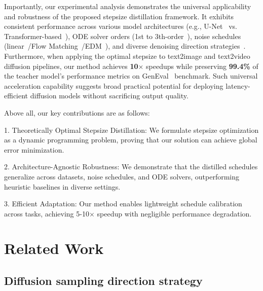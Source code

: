 \documentclass[10pt,twocolumn,letterpaper]{article}
\begin{document}
    Importantly, our experimental analysis demonstrates the universal applicability and robustness of the proposed stepsize distillation framework. It exhibits consistent performance across various model architectures (e.g., U-Net~\cite{edm} vs. Transformer-based~\cite{dit}), ODE solver orders (1st to 3th-order~\cite{dpm++}), noise schedules (linear~\cite{ddim}/Flow Matching~\cite{rf, lipman2022flow}/EDM~\cite{edm}), and diverse denoising direction strategies~\cite{unipc, dpm, dpm++}. Furthermore, when applying the optimal stepsize to text2image and text2video diffusion pipelines, our method achieves \textbf{10$\times$} speedups while preserving \textbf{99.4\%} of the teacher model's performance metrics on GenEval~\cite{ghosh2023geneval} benchmark. Such universal acceleration capability suggests broad practical potential for deploying latency-efficient diffusion models without sacrificing output quality.

    Above all, our key contributions are as follows:

    1. Theoretically Optimal Stepsize Distillation: We formulate stepsize optimization as a dynamic programming problem, proving that our solution can achieve global error minimization.

    2. Architecture-Agnostic Robustness: We demonstrate that the distilled schedules generalize across datasets, noise schedules, and ODE solvers, outperforming heuristic baselines in diverse settings.

    3. Efficient Adaptation: Our method enables lightweight schedule calibration across tasks, achieving 5-10$\times$ speedup with negligible performance degradation.
     \section{Related Work} 

    \subsection{Diffusion sampling direction strategy}
    
\end{document}

